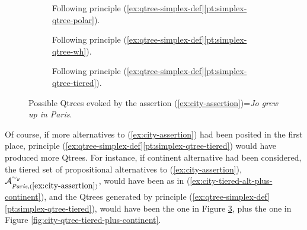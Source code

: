 \begin{figure}[H]
	\centering
	\begin{subfigure}[t]{.23\linewidth}
		\centering
		\caption{Following principle (\ref{ex:qtree-simplex-def}\ref{pt:simplex-qtree-polar}).}\label{fig:city-qtree-polar}
	\end{subfigure}
	\hfill
	\begin{subfigure}[t]{.33\linewidth}
		\centering		{}
		\caption{Following principle (\ref{ex:qtree-simplex-def}\ref{pt:simplex-qtree-wh}).}\label{fig:city-qtree-wh}
	\end{subfigure}
	\hfill
	\begin{subfigure}[t]{.38\linewidth}
		\centering{}
		\caption{Following principle (\ref{ex:qtree-simplex-def}\ref{pt:simplex-qtree-tiered}).}\label{fig:city-qtree-tiered}
	\end{subfigure}
	\caption{Possible Qtrees evoked by the assertion (\ref{ex:city-assertion})=\textit{Jo grew up in Paris}.}\label{fig:city-qtrees}
\end{figure}

Of course, if more alternatives to (\ref{ex:city-assertion}) had been posited in the first place, principle (\ref{ex:qtree-simplex-def}\ref{pt:simplex-qtree-tiered}) would have produced more Qtrees. For instance, if continent alternative had been considered, the tiered set of propositional alternatives to (\ref{ex:city-assertion}), $\mathcal{A}_{\textit{Paris}, (\ref{ex:city-assertion})}^{\sim_g}$, would have been as in (\ref{ex:city-tiered-alt-plus-continent}), and the Qtrees generated by principle (\ref{ex:qtree-simplex-def}\ref{pt:simplex-qtree-tiered}), would have been the one in Figure \ref{fig:city-qtree-tiered}, plus the one in Figure \ref{fig:city-qtree-tiered-plus-continent}.

